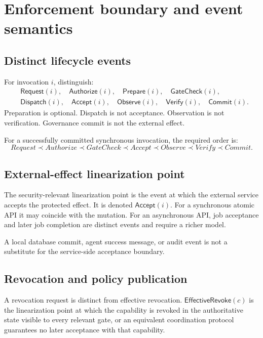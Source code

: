 \documentclass[11pt,a4paper]{article}
\theoremstyle{remark}
\begin{document}
\section{Enforcement boundary and event semantics}

\subsection{Distinct lifecycle events}

For invocation $i$, distinguish:
\[
\begin{split}
&\mathsf{Request}(i),\quad \mathsf{Authorize}(i),\quad
\mathsf{Prepare}(i),\quad \mathsf{GateCheck}(i),\\
&\mathsf{Dispatch}(i),\quad \mathsf{Accept}(i),\quad
\mathsf{Observe}(i),\quad \mathsf{Verify}(i),\quad
\mathsf{Commit}(i).
\end{split}
\]
Preparation is optional. Dispatch is not acceptance. Observation is not verification. Governance commit is not the external effect.

For a successfully committed synchronous invocation, the required order is:
\[
Request \prec Authorize \prec GateCheck \prec Accept
\prec Observe \prec Verify \prec Commit.
\]

\subsection{External-effect linearization point}

The security-relevant linearization point is the event at which the external service accepts the protected effect. It is denoted $\mathsf{Accept}(i)$. For a synchronous atomic API it may coincide with the mutation. For an asynchronous API, job acceptance and later job completion are distinct events and require a richer model.

A local database commit, agent success message, or audit event is not a substitute for the service-side acceptance boundary.

\subsection{Revocation and policy publication}

A revocation request is distinct from effective revocation. $\mathsf{EffectiveRevoke}(c)$ is the linearization point at which the capability is revoked in the authoritative state visible to every relevant gate, or an equivalent coordination protocol guarantees no later acceptance with that capability.
\end{document}
